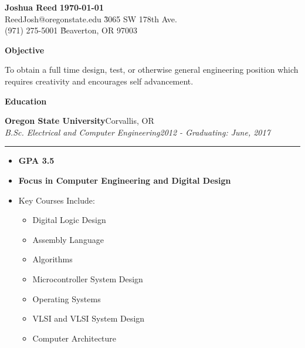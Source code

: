 \documentclass[margin, line]{res}
\newcommand{\resheading}[1]{
  \begin{tcolorbox}[width=\textwidth,
                    frame hidden,
                    colback=black!30,
                    enhanced,
                    top=0pt,
                    bottom=0pt,
                    height=16pt
                    ]
      \bf #1
  \end{tcolorbox}
  }
\newcommand{\ressubheading}[4]{
  \begin{minipage}{\textwidth}
  {\textbf{#1}\hfill #2} \\
  {\textit{#3}\hfill \textit{#4}}
  \end{minipage}
  \rule{\textwidth}{1pt}
  }
\begin{document}

\begin{tabbing}
  \textbf{\Large Joshua Reed} \` \textbf{\today} \\
  ReedJosh@oregonstate.edu    \` 3065 SW 178th Ave. \\
  (971) 275-5001              \` Beaverton, OR 97003 \\ 
\end{tabbing}

\resheading{Objective}

To obtain a full time design, test, or otherwise general engineering position 
which requires creativity and encourages self advancement. 

\resheading{Education}

\ressubheading{Oregon State University}
              {Corvallis, OR}
              {B.Sc. Electrical and Computer Engineering}
              {2012 - Graduating: June, 2017}
\begin{itemize}[nolistsep, noitemsep, topsep=0pt]
  \item{\bf GPA 3.5}
  \item{\bf Focus in Computer Engineering and Digital Design} 
  \item Key Courses Include:
    \setlength{\multicolsep}{0pt}
    \begin{multicols}{2}    
      \begin{itemize}[nolistsep,noitemsep,topsep=0pt]
        \item Digital Logic Design  
        \item Assembly Language 
        \item Algorithms 
        \item Microcontroller System Design 
        \item Operating Systems 
        \item VLSI and VLSI System Design 
        \item Computer Architecture 
      \end{itemize}
    \end{multicols}
\end{itemize}
\end{document}

